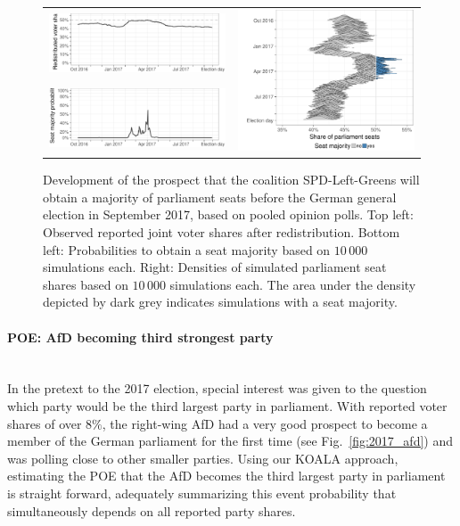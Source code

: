 \documentclass[smallcondensed]{svjour3}     %
\begin{document}
\begin{figure}[H]\centering
\begin{tabular}{ll}
\includegraphics[height=.15\textwidth]{figures/2017_pooled_spdleftgreens_rawSharesRedist.pdf}
&
\multirow{2}{*}[13ex]{\includegraphics[height=30ex]{figures/2017_pooled_spdleftgreens_ridgeline.pdf}}
\\
\includegraphics[height=.15\textwidth]{figures/2017_pooled_spdleftgreens_prob.pdf}
\end{tabular}
\caption{Development of the prospect that the coalition SPD-Left-Greens will
obtain a majority of parliament seats before the German
general election in September 2017, based on pooled opinion polls.
Top left: Observed reported joint voter shares after redistribution.
Bottom left: Probabilities to obtain a seat majority based on $10\,000$ simulations each.
Right: Densities of simulated parliament seat shares based on $10\,000$ simulations each.
The area under the density depicted by dark grey indicates simulations with a
seat majority.
\label{fig:2017_spdleftgreens}
}
\end{figure}

\paragraph{POE: AfD becoming third strongest party} \ \\
In the pretext to the 2017 election, special interest was given to the question
which party would be the third largest party in parliament.
With reported voter shares of over $8\%$, the right-wing AfD had a very good
prospect to become a member of the German parliament for the first time
(see Fig.~\ref{fig:2017_afd}) and was polling close to other smaller parties.
Using our KOALA approach, estimating the POE that the AfD becomes
the third largest party in parliament is straight forward, adequately summarizing
this event probability that simultaneously depends on all reported party shares.
\end{document}
